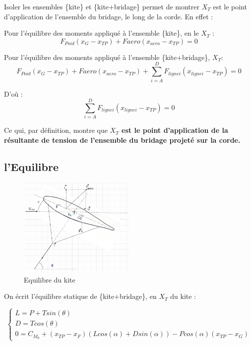 \documentclass[conference]{IEEEtran}
\begin{document}
Isoler les ensembles \{kite\} et \{kite+bridage\} permet de montrer $X_T$ est le point d'application de l'ensemble du bridage, le long de la corde. En effet :

Pour l'équilibre des moments appliqué à l'ensemble \{kite\}, en le $X_T$ :
\begin{equation}
    F_{Poid}(x_G-x_{TP})+F{aero}(x_{aero}-x_{TP}) = 0
\end{equation}

Pour l'équilibre des moments appliqué à l'ensemble \{kite+bridage\}, $X_T$:
\begin{equation}
    F_{Poid}(x_G-x_{TP}) + F{aero}(x_{aero}-x_{TP}) + \sum_{i=A}^{D} F_{ligne i}(x_{ligne i}-x_{TP})= 0
\end{equation}

D'où : 
\begin{equation}
    \sum_{i=A}^{D} F_{ligne i}(x_{ligne i}-x_{TP})= 0
\end{equation}

Ce qui, par définition, montre que \textbf{$X_T$ est le point d'application de la résultante de tension de l'ensemble du bridage projeté sur la corde.}

\subsection{l'Equilibre} 

\begin{figure}[H]
    \centering
    \includegraphics[width=0.5\textwidth]{Pics/Equilibre Kite.png}  
    \caption{Equilibre du kite}
    \label{fig:Equilibre du kite}
\end{figure}

On écrit l'équilibre statique de \{kite+bridage\}, en $X_T$ du kite : 

\begin{equation}
    \begin{cases}
        L = P + T sin(\theta) \\
        D = T cos(\theta) \\
        0 = C_{M_0} + (x_{TP} - x_F) (L cos(\alpha) + D sin(\alpha)) - P cos(\alpha) (x_{TP} - x_G)
    \end{cases}
\end{equation}
\end{document}
